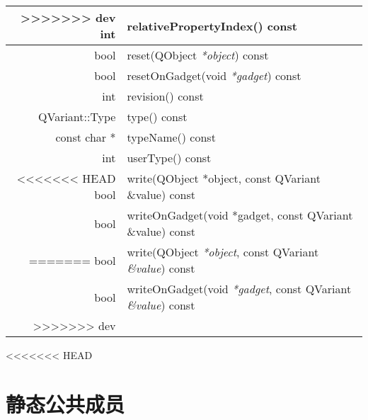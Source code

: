 \begin{longtable}{|r|m{28em}|}
>>>>>>> dev
\hline
int 	&relativePropertyIndex() const\\
\hline
bool &	reset(QObject \emph{*object}) const\\
\hline
bool 	&resetOnGadget(void \emph{*gadget}) const \\
\hline
int 	&revision() const\\
\hline
QVariant::Type &	type() const \\
\hline
const char * &	typeName() const \\ 
\hline
int 	& userType() const \\ 
\hline
<<<<<<< HEAD
bool &	write(QObject *object, const QVariant \&value) const \\ 
\hline
bool 	&writeOnGadget(void *gadget, const QVariant \&value) const \\ 
=======
bool &	write(QObject \emph{*object}, const QVariant \emph{\&value}) const \\ 
\hline
bool 	&writeOnGadget(void \emph{*gadget}, const QVariant \emph{\&value}) const \\ 
>>>>>>> dev
\hline
\end{longtable}


<<<<<<< HEAD

\section{静态公共成员}

